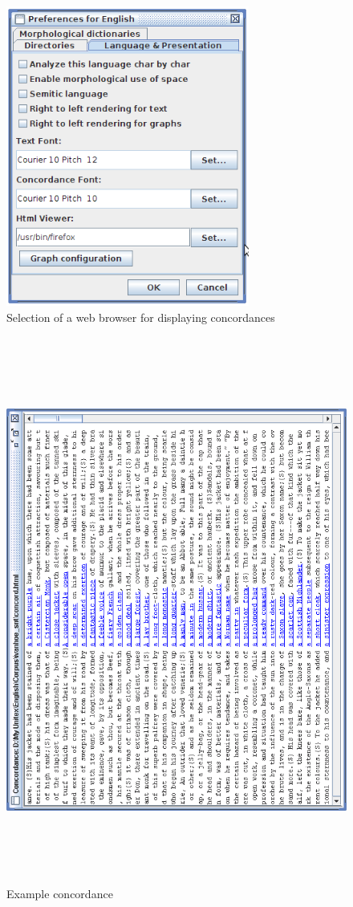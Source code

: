 \bigskip
\begin{figure}[h]
\begin{center}
\includegraphics[width=8cm]{resources/img/fig4-7.png}
\caption{Selection of a web browser for displaying
concordances\label{fig-browser-selection}}
\end{center}
\end{figure}

\bigskip
\begin{figure}[!p]
\begin{center}
\includegraphics[height=18cm]{resources/img/fig4-8.png}
\caption{Example concordance\label{fig-example-concordance}}
\end{center}
\end{figure}


